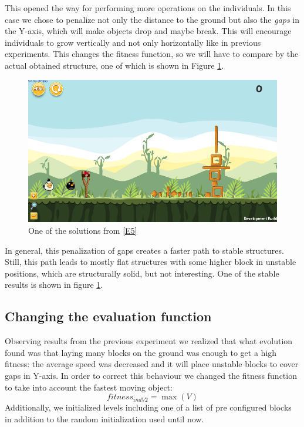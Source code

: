 \documentclass[sigconf]{acmart}
\begin{document}
This opened the way for performing more 
operations on the individuals. In this case we chose to penalize
not only the distance to the ground but also the \textit{gaps} in the
Y-axis, which will make objects drop and maybe break.
This will encourage individuals to grow vertically and not only horizontally
like in previous experiments. This changes the fitness function, so we
will have to compare by the actual obtained structure, one of which is
shown in Figure \ref{f:e5}.
%
 \begin{figure}
 	\centering
 	\includegraphics[scale=0.3]{E5.png}
 	\caption{One of the solutions from \ref{E5}}\label{f:e5}
      \end{figure}

In general, this penalization of gaps creates a faster path to stable
structures. Still, this path leads to mostly flat structures with 
some higher block in unstable positions, which
are structurally solid, but not interesting. One of the stable results is shown 
in figure \ref{f:e5}.

\subsection{Changing the evaluation function}\label{E6}

Observing results from the previous experiment we realized that what
evolution found was that laying many blocks on the ground was enough
to get a high fitness: the average speed was decreased and it will
place unstable blocks to cover gaps in Y-axis. In
order to correct this behaviour we changed the 
fitness function to take into account the fastest moving object:
$$fitness_{indV2} = \max{(V)}$$
Additionally, we initialized levels including one of a list of pre configured
blocks in addition to the random initialization used until
now.
\end{document}
